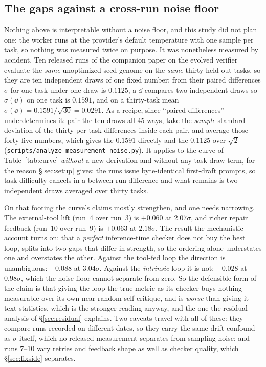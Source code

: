 \documentclass[11pt]{article}
\begin{document}
\subsection{The gaps against a cross-run noise floor}
\label{sec:sigmaratios}

Nothing above is interpretable without a noise floor, and this study did not plan one: the worker
runs at the provider's default temperature with one sample per task, so nothing was measured twice
on purpose. It was nonetheless measured by accident. Ten released runs of the companion paper on
the evolved verifier
evaluate the \emph{same} unoptimized seed genome on the \emph{same} thirty held-out tasks, so they
are ten independent draws of one fixed number; from their paired differences $\sigma$ for one task
under one draw is $0.1125$, a $\dd$ compares two independent draws so $\sigma(\dd)$ on one task is
$0.1591$, and on a thirty-task mean $\sigma(\dd) = 0.1591/\sqrt{30} = 0.0291$. As a recipe, since
``paired differences'' underdetermines it: pair the ten draws all $45$ ways, take the \emph{sample}
standard deviation of the thirty per-task differences inside each pair, and average those
forty-five numbers, which gives the $0.1591$ directly and the $0.1125$ over $\sqrt{2}$
(\texttt{scripts/analyze\_measurement\_noise.py}). It applies to the
curve of Table~\ref{tab:curve} \emph{without} a new derivation and without any task-draw term, for
the reason \S\ref{sec:setup} gives: the runs issue byte-identical first-draft prompts, so task
difficulty cancels in a between-run difference and what remains is two independent draws averaged
over thirty tasks.

On that footing the curve's claims mostly strengthen, and one needs narrowing. The external-tool
lift (run~4 over run~3) is $+0.060$ at $2.07\sigma$, and richer repair feedback (run~10 over
run~9) is $+0.063$ at $2.18\sigma$. The result the mechanistic account turns on: that a
\emph{perfect} inference-time checker does not buy the best loop, splits into two gaps that
differ in strength, so the ordering alone understates one and overstates the other. Against the
tool-fed loop the direction is unambiguous:
$-0.088$ at $3.04\sigma$. Against the \emph{intrinsic} loop it is not: $-0.028$ at $0.98\sigma$,
which the noise floor cannot separate from zero. So the defensible form of the claim is that giving the loop the true
metric as its checker buys nothing measurable over its own near-random self-critique, and is
\emph{worse} than giving it text statistics, which is the stronger reading anyway, and the one
the residual analysis of \S\ref{sec:residual} explains. Two caveats travel with all of these:
they compare runs recorded on different dates, so they carry the same drift confound as $\sigma$
itself, which no released measurement separates from sampling noise; and runs 7--10 vary retries
and feedback shape as well as checker quality, which \S\ref{sec:fixside} separates.
\end{document}
